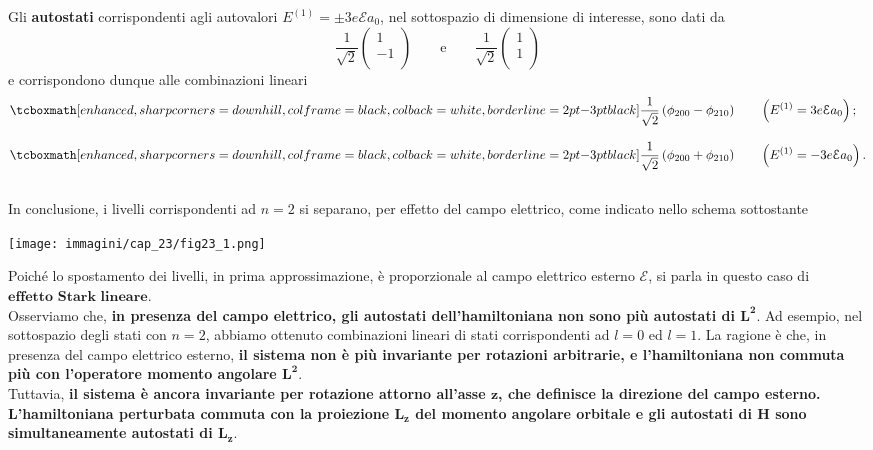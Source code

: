 \documentclass[a4paper,12pt,oneside]{book}
\begin{document}
Gli \textbf{autostati} corrispondenti agli autovalori $E^{(1)}=\pm 3e\mathcal{E}a_0$, nel sottospazio di dimensione  di interesse, sono dati da
	\begin{equation} 
		\frac{1}{\sqrt{2}} 
		\begin{pmatrix}
		1 \\
		-1 \\
		\end{pmatrix}
		\qquad \textrm{e} \qquad 
		\frac{1}{\sqrt{2}}
		\begin{pmatrix}
		1 \\
		1 \\
		\end{pmatrix}
	\end{equation}
e corrispondono dunque alle combinazioni lineari 
\begin{align}
& \tcboxmath[enhanced, sharp corners=downhill, colframe=black, colback=white, borderline={2pt}{-3pt}{black}]{
\frac{1}{\sqrt{2}} \left( \phi_{200}-\phi_{210} \right) 
} \qquad 
\left( E^{(1)}=3e\mathcal{E}a_0 \right) ;\\[0.3cm]
&\tcboxmath[enhanced, sharp corners=downhill, colframe=black, colback=white, borderline={2pt}{-3pt}{black}]{
\frac{1}{\sqrt{2}} \left( \phi_{200}+\phi_{210} \right)
}\qquad
\left( E^{(1)}=-3e\mathcal{E}a_0 \right) .
\end{align}\\

In conclusione, i livelli corrispondenti ad $n=2$ si separano, per effetto del campo elettrico, come indicato nello schema sottostante
\begin{center}
\texttt{[image: immagini/cap\_23/fig23\_1.png]}
\end{center}
Poiché lo spostamento dei livelli, in prima approssimazione, è proporzionale al campo elettrico esterno $\mathcal{E}$, si parla in questo caso di $\textbf{effetto Stark lineare}$.\\

Osserviamo che, \textbf{in presenza del campo elettrico, gli autostati dell'hamiltoniana non sono più autostati di $\boldsymbol{L^2}$}. Ad esempio, nel sottospazio degli stati con $n=2$, abbiamo ottenuto combinazioni lineari di stati corrispondenti ad $l=0$ ed $l=1$. La ragione è che, in presenza del campo elettrico esterno, \textbf{il sistema non è più invariante per rotazioni arbitrarie, e l'hamiltoniana non commuta più con l'operatore momento angolare $\boldsymbol{L^2}$}.\\
Tuttavia, \textbf{il sistema è ancora invariante per rotazione attorno all'asse $\boldsymbol{z}$, che definisce la direzione del campo esterno. L'hamiltoniana perturbata commuta con la proiezione $\boldsymbol{L_z}$ del momento angolare orbitale e gli autostati di $\boldsymbol{H}$ sono simultaneamente autostati di $\boldsymbol{L_z}$}.
\end{document}
